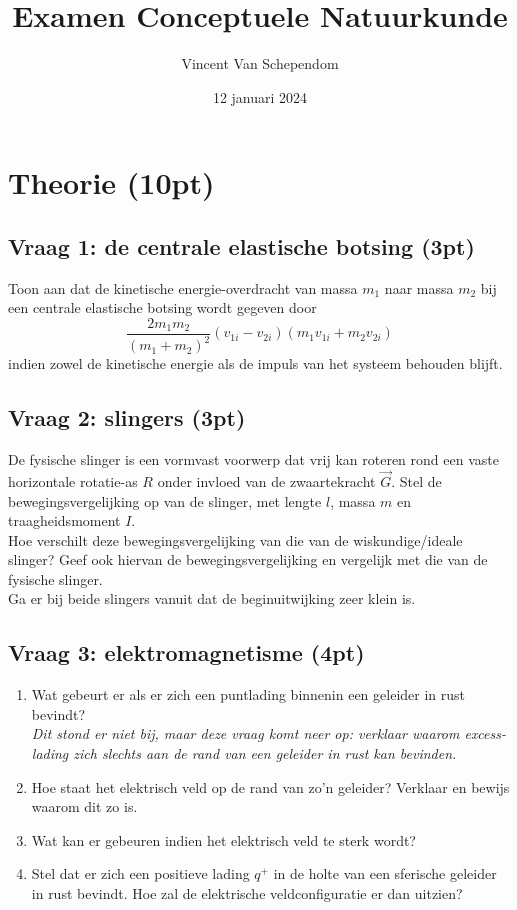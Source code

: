 \documentclass[kulak]{kulakarticle} %
\title{Examen Conceptuele Natuurkunde}
\author{Vincent Van Schependom}
\date{12 januari 2024}
\begin{document}
\maketitle

\section{Theorie (10pt)}

\subsection{Vraag 1: de centrale elastische botsing (3pt)}

Toon aan dat de kinetische energie-overdracht van massa \(m_1\) naar massa \(m_2\) bij een centrale elastische botsing wordt gegeven door \[\frac{2m_1m_2}{(m_1+m_2)^2}(v_{1i}-v_{2i})(m_1v_{1i}+m_2v_{2i})\] indien zowel de kinetische energie als de impuls van het systeem behouden blijft.

\subsection{Vraag 2: slingers (3pt)}

De fysische slinger is een vormvast voorwerp dat vrij kan roteren rond een vaste horizontale rotatie-as \(R\) onder invloed van de zwaartekracht \(\vec{G}\). Stel de bewegingsvergelijking op van de slinger, met lengte \(l\), massa \(m\) en traagheidsmoment \(I\).\\

\noindent Hoe verschilt deze bewegingsvergelijking van die van de wiskundige/ideale slinger? Geef ook hiervan de bewegingsvergelijking en vergelijk met die van de fysische slinger.\\

\noindent Ga er bij beide slingers vanuit dat de beginuitwijking zeer klein is.

\subsection{Vraag 3: elektromagnetisme (4pt)}

\begin{enumerate}
	\item Wat gebeurt er als er zich een puntlading binnenin een geleider in rust bevindt? \\\textit{Dit stond er niet bij, maar deze vraag komt neer op: verklaar waarom excess-lading zich slechts aan de rand van een geleider in rust kan bevinden.}
	\item Hoe staat het elektrisch veld op de rand van zo'n geleider? Verklaar en bewijs waarom dit zo is.
	\item Wat kan er gebeuren indien het elektrisch veld te sterk wordt?
	\item Stel dat er zich een positieve lading \(q^+\) in de holte van een sferische geleider in rust bevindt. Hoe zal de elektrische veldconfiguratie er dan uitzien?
\end{enumerate}
\end{document}
